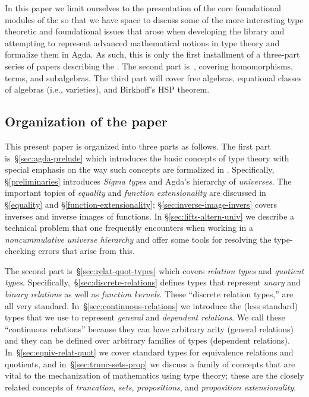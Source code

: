 In this paper we limit ourselves to the presentation of the core foundational modules of the \ualib so that we have space to discuss some of the more interesting type theoretic and foundational issues that arose when developing the library and attempting to represent advanced mathematical notions in type theory and formalize them in Agda.  As such, this is only the first installment of a three-part series of papers describing the \agdaualib. The second part is~\cite{DeMeo:2021-2}, covering homomorphisms, terms, and subalgebras. The third part will cover free algebras, equational classes of algebras (i.e., varieties), and Birkhoff's HSP theorem.

\subsection{Organization of the paper}\label{sec:organization}

This present paper is organized into three parts as follows. The first part is~\S\ref{sec:agda-prelude} which introduces the basic concepts of type theory with special emphasis on the way such concepts are formalized in \agda. Specifically, \S\ref{preliminaries} introduces \emph{Sigma types} and Agda's hierarchy of \emph{universes}. The important topics of \emph{equality} and \emph{function extensionality} are discussed in \S\ref{equality} and \S\ref{function-extensionality}; \S\ref{sec:inverse-image-invers} covers inverses and inverse images of functions. In \S\ref{sec:lifts-altern-univ} we describe a technical problem that one frequently encounters when working in a \emph{noncummulative universe hierarchy} and offer some tools for resolving the type-checking errors that arise from this.

The second part is~\S\ref{sec:relat-quot-types} which covers \emph{relation types} and \emph{quotient types}. Specifically,~\S\ref{sec:discrete-relations} defines types that represent \emph{unary} and \emph{binary relations} as well as \emph{function kernels}. These ``discrete relation types,'' are all very standard.  In~\S\ref{sec:continuous-relations} we introduce the (less standard) types that we use to represent \emph{general} and \emph{dependent relations}. We call these ``continuous relations'' because they can have arbitrary arity (general relations) and they can be defined over arbitrary families of types (dependent relations).
In~\S\ref{sec:equiv-relat-quot} we cover standard types for equivalence relations and quotients, and in~\S\ref{sec:trunc-sets-prop} we discuss a family of concepts that are vital to the mechanization of mathematics using type theory; these are the closely related concepts of \emph{truncation}, \emph{sets}, \emph{propositions}, and \emph{proposition extensionality}.


